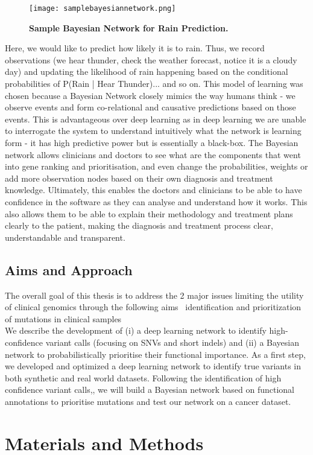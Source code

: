 \documentclass{article}
\begin{document}
\begin{figure}[H]
\centering
\texttt{[image: samplebayesiannetwork.png]}
\caption{\textbf{Sample Bayesian Network for Rain Prediction.}}
\end{figure}
Here, we would like to predict how likely it is to rain. Thus, we record observations (we hear thunder, check the weather forecast, notice it is a cloudy day) and updating the likelihood of rain happening based on the conditional probabilities of P(Rain | Hear Thunder)... and so on. This model of learning was chosen because a Bayesian Network closely mimics the way humans think - we observe events and form co-relational and causative predictions based on those events. This is advantageous over deep learning as in deep learning we are unable to interrogate the system to understand intuitively what the network is learning form - it has high predictive power but is essentially a black-box. The Bayesian network allows clinicians and doctors to see what are the components that went into gene ranking and prioritisation, and even change the probabilities, weights or add more observation nodes based on their own diagnosis and treatment knowledge. Ultimately, this enables the doctors and clinicians to be able to have confidence in the software as they can analyse and understand how it works. This also allows them to be able to explain their methodology and treatment plans clearly to the patient, making the diagnosis and treatment process clear, understandable and transparent.
\subsection{Aims and Approach}
The overall goal of this thesis is to address the 2 major issues limiting the utility of clinical genomics through the following aims \: \ identification and prioritization of mutations in clinical samples \\ We describe the development of (i) a deep learning network to identify high-confidence variant calls (focusing on SNVs and short indels) and (ii) a Bayesian network to probabilistically prioritise their functional importance. As a first step, we developed and optimized a deep learning network to identify true variants in both synthetic and real world datasets. Following the identification of high confidence variant calls,, we will build a Bayesian network based on functional annotations to prioritise mutations and test our network on a cancer dataset.
\newpage
\section{Materials and Methods}
\end{document}
